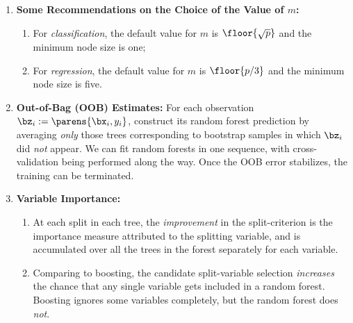\documentclass[12pt]{article}
\begin{document}
\begin{enumerate}[label=\textbf{\arabic*.}]

	\item \textbf{Some Recommendations on the Choice of the Value of $m$:} 
	\begin{enumerate}
		\item For \textit{classification}, the default value for $m$ is $\floor{\sqrt{p}}$ and the minimum node size is one; 
		\item For \textit{regression}, the default value for $m$ is $\floor{p/3}$ and the minimum node size is five. 
	\end{enumerate}
	
	\item \textbf{Out-of-Bag (OOB) Estimates:} For each observation $\bz_i := \parens{\bx_i, y_i}$, construct its random forest prediction by averaging \textit{only} those trees corresponding to bootstrap samples in which $\bz_i$ did \emph{not} appear. \newline We can fit random forests in one sequence, with cross-validation being performed along the way. Once the OOB error stabilizes, the training can be terminated. 
	
	\item \textbf{Variable Importance:} 
	\begin{enumerate}
		\item At each split in each tree, the \textit{improvement} in the split-criterion is the importance measure attributed to the splitting variable, and is accumulated over all the trees in the forest separately for each variable. 
		\item Comparing to boosting, the candidate split-variable selection \textit{increases} the chance that any single variable gets included in a random forest. Boosting ignores some variables completely, but the random forest does \emph{not}. 
	\end{enumerate}
	

\end{enumerate}
\end{document}
